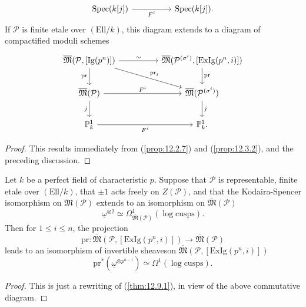 \begin{kthm}
\[\begin{tikzcd}[row sep=2em, column sep=huge]
\Spec(k[j]) \arrow[r, "F^i"'] & \Spec(k[j]) .
\end{tikzcd}
\]
If $\mathcal{P}$ is finite etale over $(\mathrm{Ell}/k)$, this diagram extends to a diagram of compactified moduli schemes
\[
\begin{tikzcd}[row sep=2em, column sep=huge]
\overline{\mathfrak{M}}(\mathcal{P}, [\mathrm{Ig}(p^n)]) \arrow[r, "\sim"] \arrow[d, "\mathrm{pr}"'] \arrow[rd, "\mathrm{pr}_i"] & \overline{\mathfrak{M}}(\mathcal{P}^{(\sigma^i)}, [\mathrm{ExIg}(p^n, i)]) \arrow[d, "\mathrm{pr}"] \\
\overline{\mathfrak{M}}(\mathcal{P}) \arrow[r, "F^i"] \arrow[d, "j"'] & \overline{\mathfrak{M}}(\mathcal{P}^{(\sigma^i)}) \arrow[d, "j"] \\
\mathbb{P}^1_k \arrow[r, "F^i"'] & \mathbb{P}^1_k .
\end{tikzcd}
\]
\end{kthm}

\begin{proof}
This results immediately from (\ref{prop:12.2.7}) and (\ref{prop:12.3.2}), and the preceding discussion.
\end{proof}

\begin{kcor}\label{cor:12.10.7}
Let $k$ be a perfect field of characteristic $p$. Suppose that $\mathcal{P}$ is representable, finite etale over $(\mathrm{Ell}/k)$, that $\pm 1$ acts freely on $Z(\mathcal{P})$, and that the Kodaira-Spencer isomorphism on $\mathfrak{M}(\mathcal{P})$ extends to an isomorphism on $\overline{\mathfrak{M}}(\mathcal{P})$
\[
\underline{\omega}^{\otimes 2} \simeq \Omega^1_{\overline{\mathfrak{M}}(\mathcal{P})}(\log\mathrm{cusps}) .
\]
Then for $1 \le i \le n$, the projection
\[
\mathrm{pr} : \overline{\mathfrak{M}}(\mathcal{P}, [\mathrm{ExIg}(p^n, i)]) \to \overline{\mathfrak{M}}(\mathcal{P})
\]
leads to an isomorphism of invertible sheaves\linebreak on $\overline{\mathfrak{M}}(\mathcal{P}, [\mathrm{ExIg}(p^n, i)])$
\[
\mathrm{pr}^*(\underline{\omega}^{\otimes p^{n-i}}) \simeq \Omega^1(\log\mathrm{cusps}) .
\]
\end{kcor}

\begin{proof}
This is just a rewriting of (\ref{thm:12.9.1}), in view of the above commutative diagram.
\end{proof}

